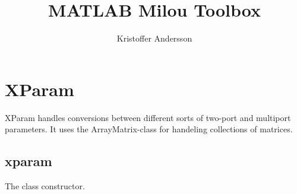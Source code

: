 \documentclass[11pt]{article}
\title{MATLAB Milou Toolbox}
\author{Kristoffer Andersson}
\begin{document}
\maketitle

\section{XParam}
XParam handles conversions between different sorts of two-port and multiport parameters. It uses the ArrayMatrix-class for handeling collections of matrices.

\subsection*{xparam}
The class constructor.
\end{document}
